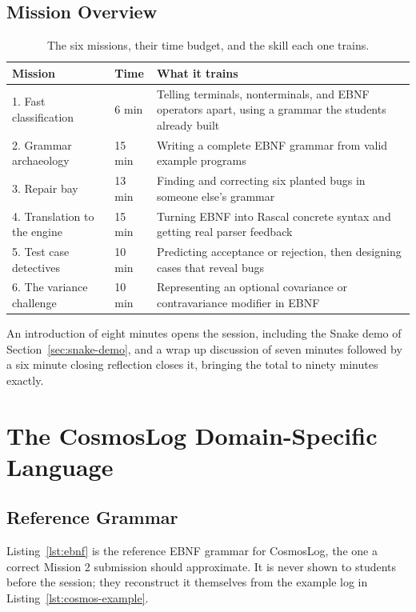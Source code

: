 \documentclass[11pt]{article}
\begin{document}
\subsection{Mission Overview}

\begin{table}[h!]
\centering
\small
\begin{tabularx}{\textwidth}{@{}l l X@{}}
\toprule
\textbf{Mission} & \textbf{Time} & \textbf{What it trains} \\
\midrule
1. Fast classification & 6 min & Telling terminals, nonterminals, and EBNF operators apart, using a grammar the students already built \\
2. Grammar archaeology & 15 min & Writing a complete EBNF grammar from valid example programs \\
3. Repair bay & 13 min & Finding and correcting six planted bugs in someone else's grammar \\
4. Translation to the engine & 15 min & Turning EBNF into Rascal concrete syntax and getting real parser feedback \\
5. Test case detectives & 10 min & Predicting acceptance or rejection, then designing cases that reveal bugs \\
6. The variance challenge & 10 min & Representing an optional covariance or contravariance modifier in EBNF \\
\bottomrule
\end{tabularx}
\caption{The six missions, their time budget, and the skill each one trains.}
\end{table}

An introduction of eight minutes opens the session, including the Snake
demo of Section~\ref{sec:snake-demo}, and a wrap up discussion of seven
minutes followed by a six minute closing reflection closes it, bringing
the total to ninety minutes exactly.

\section{The CosmosLog Domain-Specific Language}

\subsection{Reference Grammar}

Listing~\ref{lst:ebnf} is the reference EBNF grammar for CosmosLog, the one
a correct Mission 2 submission should approximate. It is never shown to
students before the session; they reconstruct it themselves from the
example log in Listing~\ref{lst:cosmos-example}.
\end{document}

